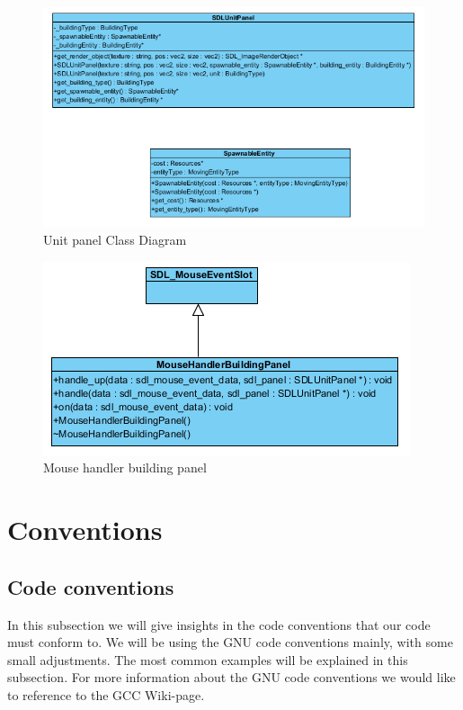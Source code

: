 \begin{figure}[!htb]
    \centering
    \includegraphics[scale=0.8]{res/unit-panel-class-diagram.png}
    \caption{Unit panel Class Diagram}\label{fig:unit-panel-class-diagram}
\end{figure}

\begin{figure}[!htb]
    \centering
    \includegraphics[scale=0.8]{res/mousehandlerbuildingpanel.png}
    \caption{Mouse handler building panel}\label{fig:mousehandlerbuildingpanel}
\end{figure}

\section{Conventions}
\subsection{Code conventions}
In this subsection we will give insights in the code conventions that our code must conform to. We will be using the GNU code conventions mainly, with some small adjustments.
The most common examples will be explained in this subsection. For more information about the GNU code conventions we would like to reference to the GCC Wiki-page. \cite{gccwcc}
